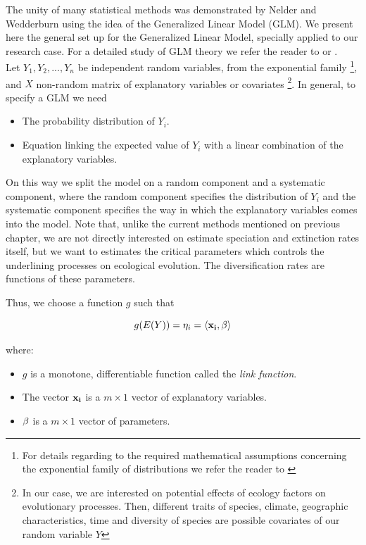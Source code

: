  The unity of many statistical methods was demonstrated by Nelder and Wedderburn \cite{nelder} using the idea of the Generalized Linear Model (GLM). We present here the general set up for the Generalized Linear Model, specially applied to our research case. For a detailed study of GLM theory we refer the reader to \cite{Dobson2008} or \cite{mccullagp.j.a.nelder1989}.\\ 

Let $Y_1, Y_2, ..., Y_n$ be independent random variables, from the exponential family \footnote{For details regarding to the required mathematical assumptions concerning the exponential family of distributions we refer the reader to \cite{casella}}, and $X$ non-random matrix of explanatory variables or covariates \footnote{In our case, we are interested on potential effects of ecology factors on evolutionary processes. Then, different traits of species, climate, geographic characteristics, time and diversity of species are possible covariates of our random variable $Y$}. In general, to specify a GLM we need 

\begin{itemize}
	\item The probability distribution of $Y_i$.
	\item Equation linking the expected value of $Y_i$ with a linear combination of the explanatory variables.
	
\end{itemize} 


On this way we split the model on a random component and a systematic component, where the random component specifies the distribution of $Y_i$ and the systematic component specifies the way in which the explanatory variables comes into the model. Note that, unlike the current methods mentioned on previous chapter, we are not directly interested on estimate speciation and extinction rates itself, but we want to estimates the critical parameters which controls the underlining processes on ecological evolution. The diversification rates are functions of these parameters. 

Thus, we choose a function $g$ such that 

		$$ g(E(Y)) = \eta_i = \langle \bf{x_i}, \bf{\beta} \rangle $$
		 
where: 

\begin{itemize}

	\item $g$ is a monotone, differentiable function called the \emph{link function}.
	
	\item The vector $\bf{x}_i$ is a $m \times 1$ vector of explanatory variables.
	
	\item $\bf{\beta}$ is a $m \times 1$ vector of parameters.
	

\end{itemize}

